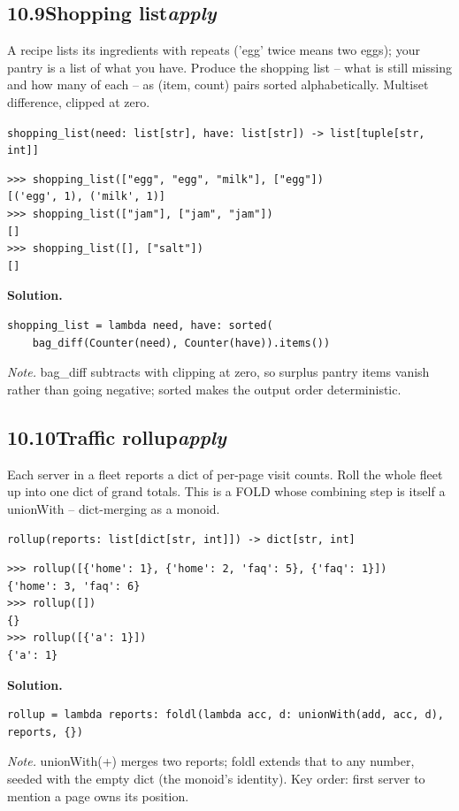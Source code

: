 \documentclass[10pt,letterpaper]{book}
\begin{document}

\subsection*{10.9\quad Shopping list\hfill\textnormal{\textit{apply}}}
A recipe lists its ingredients with repeats ('egg' twice means two eggs); your pantry is a list of what you have. Produce the shopping list -- what is still missing and how many of each -- as (item, count) pairs sorted alphabetically. Multiset difference, clipped at zero.

\noindent\texttt{shopping\_list(need: list[str], have: list[str]) -> list[tuple[str, int]]}
\begin{lstlisting}[style=ex]
>>> shopping_list(["egg", "egg", "milk"], ["egg"])
[('egg', 1), ('milk', 1)]
>>> shopping_list(["jam"], ["jam", "jam"])
[]
>>> shopping_list([], ["salt"])
[]
\end{lstlisting}
\noindent\textbf{Solution.}
\begin{lstlisting}[style=code]
shopping_list = lambda need, have: sorted(
    bag_diff(Counter(need), Counter(have)).items())
\end{lstlisting}
\noindent\textit{Note.} bag\_diff subtracts with clipping at zero, so surplus pantry items vanish rather than going negative; sorted makes the output order deterministic.

\subsection*{10.10\quad Traffic rollup\hfill\textnormal{\textit{apply}}}
Each server in a fleet reports a dict of per-page visit counts. Roll the whole fleet up into one dict of grand totals. This is a FOLD whose combining step is itself a unionWith -- dict-merging as a monoid.

\noindent\texttt{rollup(reports: list[dict[str, int]]) -> dict[str, int]}
\begin{lstlisting}[style=ex]
>>> rollup([{'home': 1}, {'home': 2, 'faq': 5}, {'faq': 1}])
{'home': 3, 'faq': 6}
>>> rollup([])
{}
>>> rollup([{'a': 1}])
{'a': 1}
\end{lstlisting}
\noindent\textbf{Solution.}
\begin{lstlisting}[style=code]
rollup = lambda reports: foldl(lambda acc, d: unionWith(add, acc, d), reports, {})
\end{lstlisting}
\noindent\textit{Note.} unionWith(+) merges two reports; foldl extends that to any number, seeded with the empty dict (the monoid's identity). Key order: first server to mention a page owns its position.
\end{document}
